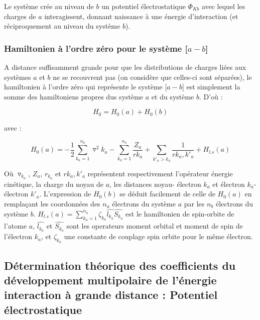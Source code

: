 Le système crée au niveau de $b$ un potentiel électrostatique $\Phi_{Kb}$ avec lequel les charges de $a$ interagissent, donnant naissance à une énergie d'interaction (et réciproquement au niveau du système $b$).

\subsubsection{Hamiltonien à l'ordre zéro pour le système [$a-b$]}

A distance suffisamment grande pour que les distributions de charges liées aux systèmes $a$ et $b$ ne se recouvrent pas (on considère que celles-ci sont séparées), le hamiltonien à l'ordre zéro qui représente le système [$a-b$] est simplement la somme des hamiltoniens propres dus système $a$ et du système $b$. D'où : 

\begin{equation}
H_{0} = H_{0}(a) + H_{0}(b) \label{1.2}
\end{equation}

avec : 

\begin{equation}
H_{0}(a) = -\frac{1}{2} \sum_{k_{a}=1}^{n_{a}} \triangledown^{2} k_{a} - \sum_{k_{a}=1}^{n_{a}} \frac{Z_{a}}{rk_{a}} + \sum_{k'_{a}>k_{a}} \frac{1}{rk_{a},k'_{a}} + H_{l.s}(a)  \label{1.3}
\end{equation}

Où $\triangledown_{k_{a}}$, $Z_{a}$, $r_{k_{a}}$ et $rk_{a},k'_{a}$ représentent respectivement l'opérateur énergie cinétique, la charge du noyau de $a$, les distances noyau- électron $k_{a}$ et électron $k_{a}$- électron $k'_{a}$. L'expression de $H_{0}(b)$ se déduit facilement de celle de $H_{0}(a)$ en remplaçant les coordonnées des $n_{a}$ électrons du système $a$ par les $n_{b}$ électrons du système $b$. $H_{l.s}(a)= \sum_{k_{a}=1}^{n_{a}} \zeta_{k_{a}} \widehat{l_{k_{a}}} \widehat{S_{k_{a}}}$ est le hamiltonien de spin-orbite de l'atome $a$, $\widehat{l_{k_{a}}}$ et $\widehat{S_{k_{a}}}$ sont les operateurs moment orbital et moment de spin de l'électron $k_{a}$, et $\zeta_{k_{a}}$ une constante de couplage spin orbite pour le même électron.

\subsection{Détermination théorique des coefficients du développement multipolaire de l’énergie interaction à grande distance : Potentiel électrostatique}


